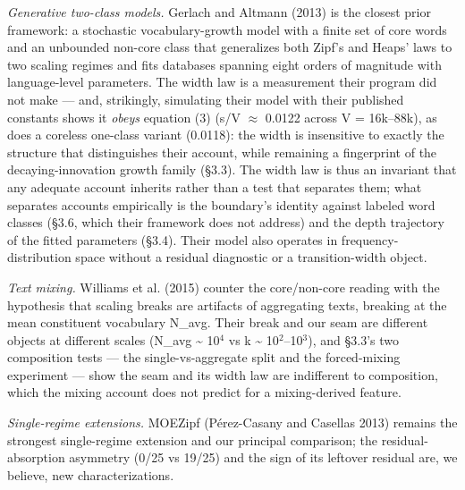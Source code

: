 \documentclass[11pt]{article}
\begin{document}
\emph{Generative two-class models.} Gerlach and Altmann (2013) is the closest prior framework: a stochastic vocabulary-growth model with a finite set of core words and an unbounded non-core class that generalizes both Zipf's and Heaps' laws to two scaling regimes and fits databases spanning eight orders of magnitude with language-level parameters. The width law is a measurement their program did not make --- and, strikingly, simulating their model with their published constants shows it \emph{obeys} equation (3) (s/V $\approx$ 0.0122 across V = 16k--88k), as does a coreless one-class variant (0.0118): the width is insensitive to exactly the structure that distinguishes their account, while remaining a fingerprint of the decaying-innovation growth family (\S3.3). The width law is thus an invariant that any adequate account inherits rather than a test that separates them; what separates accounts empirically is the boundary's identity against labeled word classes (\S3.6, which their framework does not address) and the depth trajectory of the fitted parameters (\S3.4). Their model also operates in frequency-distribution space without a residual diagnostic or a transition-width object.

\emph{Text mixing.} Williams et al. (2015) counter the core/non-core reading with the hypothesis that scaling breaks are artifacts of aggregating texts, breaking at the mean constituent vocabulary N\_avg. Their break and our seam are different objects at different scales (N\_avg \~{} 10$^{4}$ vs k \~{} 10$^{2}$--10$^{3}$), and \S3.3's two composition tests --- the single-vs-aggregate split and the forced-mixing experiment --- show the seam and its width law are indifferent to composition, which the mixing account does not predict for a mixing-derived feature.

\emph{Single-regime extensions.} MOEZipf (Pérez-Casany and Casellas 2013) remains the strongest single-regime extension and our principal comparison; the residual-absorption asymmetry (0/25 vs 19/25) and the sign of its leftover residual are, we believe, new characterizations.
\end{document}
